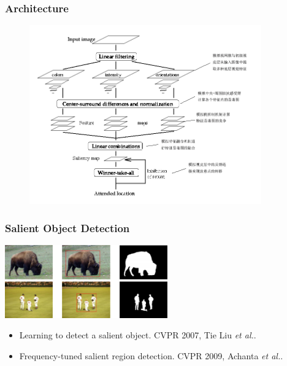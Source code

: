 \documentclass[notheorems,serif,table,compress]{beamer}  %
\begin{document}
\begin{frame}
\frametitle{Architecture}
\begin{figure}
\includegraphics[width=10cm]{ITTImodel.png}
\end{figure}
\end{frame}

%




\begin{frame}
\frametitle{Salient Object Detection}
\centering\includegraphics[width=7cm]{FT.png}
\begin{itemize}
\item Learning to detect a salient object. CVPR 2007, Tie Liu \textit{et al.}.
\item Frequency-tuned salient region detection. CVPR 2009, Achanta \textit{et al.}.
\end{itemize}
\end{frame}


\end{document}
